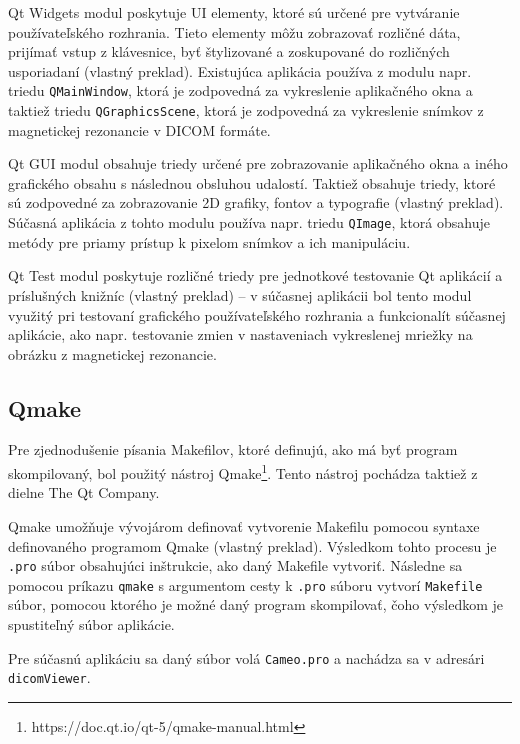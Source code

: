 Qt Widgets modul poskytuje UI elementy, ktoré sú určené pre vytváranie používateľského rozhrania. Tieto elementy môžu zobrazovať rozličné dáta, prijímať vstup z klávesnice, byť štylizované a zoskupované do rozličných usporiadaní \cite{qtwidgets_description} (vlastný preklad). Existujúca aplikácia používa z modulu napr. triedu \texttt{QMainWindow}, ktorá je zodpovedná za vykreslenie aplikačného okna a taktiež triedu \texttt{QGraphicsScene}, ktorá je zodpovedná za vykreslenie snímkov z magnetickej rezonancie v DICOM formáte.

\clearpage

Qt GUI modul obsahuje triedy určené pre zobrazovanie aplikačného okna a iného grafického obsahu s následnou obsluhou udalostí. Taktiež obsahuje triedy, ktoré sú zodpovedné za zobrazovanie 2D grafiky, fontov a typografie \cite{qtgui_description} (vlastný preklad).
Súčasná aplikácia z tohto modulu používa napr. triedu \texttt{QImage}, ktorá obsahuje metódy pre priamy prístup k pixelom snímkov a ich manipuláciu.

Qt Test modul poskytuje rozličné triedy pre jednotkové testovanie Qt aplikácií a príslušných knižníc \cite{qttest_description} (vlastný preklad) -- v súčasnej aplikácii bol tento modul využitý pri testovaní grafického používateľského rozhrania a funkcionalít súčasnej aplikácie, ako napr. testovanie zmien v nastaveniach vykreslenej mriežky na obrázku z magnetickej rezonancie.

\subsection {Qmake}\label{qmake}
Pre zjednodušenie písania Makefilov, ktoré definujú, ako má byť program skompilovaný, bol použitý nástroj Qmake\footnote{https://doc.qt.io/qt-5/qmake-manual.html}. Tento nástroj pochádza taktiež z dielne The Qt Company.

Qmake umožňuje vývojárom definovať vytvorenie Makefilu pomocou syntaxe definovaného programom Qmake \cite{qmake_description} (vlastný preklad). Výsledkom tohto procesu je \texttt{.pro} súbor obsahujúci inštrukcie, ako daný Makefile vytvoriť. \newline Následne sa pomocou príkazu \texttt{qmake} s argumentom cesty k \texttt{.pro} súboru vytvorí \texttt{Makefile} súbor, pomocou ktorého je možné daný program skompilovať, čoho výsledkom je spustiteľný súbor aplikácie.

Pre súčasnú aplikáciu sa daný súbor volá \texttt{Cameo.pro} a nachádza sa v adresári \texttt{dicomViewer}.

